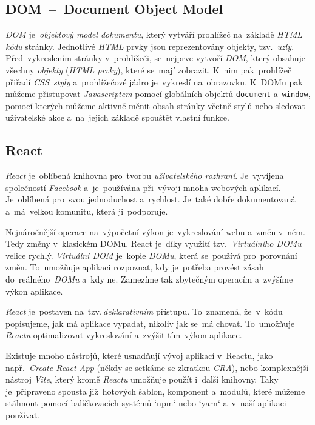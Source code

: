 \documentclass[10pt,a4paper]{article}
\begin{document}
        \subsection{DOM~--~Document Object Model}
        \emph{DOM} je~\emph{objektový model dokumentu}, který vytváří prohlížeč na~základě \emph{HTML kódu} stránky. Jednotlivé \emph{HTML} prvky jsou reprezentovány objekty, tzv.~\emph{uzly}. Před~vykreslením stránky v~prohlížeči, se~nejprve vytvoří \emph{DOM}, který obsahuje všechny \emph{objekty} (\emph{HTML prvky}), které se~mají zobrazit. K~nim pak~prohlížeč přiřadí \emph{CSS~styly} a~prohlížečové jádro je~vykreslí na~obrazovku. K~DOMu pak můžeme přistupovat \emph{Javascriptem} pomocí globálních objektů \texttt{document} a~\texttt{window}, pomocí kterých můžeme aktivně měnit obsah stránky včetně stylů nebo sledovat uživatelské akce a~na~jejich základě spouštět vlastní funkce.\cite[2.1.01]{kantor_javascript}
        
        \subsection{React}
        \emph{React} je~oblíbená knihovna pro~tvorbu \emph{uživatelského rozhraní}. Je~vyvíjena společností \emph{Facebook} a~je~používána při~vývoji mnoha webových aplikací. Je~oblíbená pro~svou jednoduchost a~rychlost. Je~také dobře dokumentovaná a~má~velkou komunitu, která ji~podporuje.
        
        Nejnáročnější operace na~výpočetní výkon je~vykreslování webu a~změn v~něm. Tedy změny v~klasickém DOMu. React je~díky využití tzv.~\emph{Virtuálního DOMu} velice rychlý. \emph{Virtuální DOM} je~kopie \emph{DOMu}, která se~používá pro~porovnání změn. To~umožňuje aplikaci rozpoznat, kdy je~potřeba provést zásah do~reálného~\emph{DOMu} a~kdy ne. Zamezíme tak zbytečným operacím a~zvýšíme výkon aplikace. \cite{elrom2021react}
        
        \emph{React} je~postaven na~tzv.\,\emph{deklarativním} přístupu. To~znamená, že~v~kódu popisujeme, jak má aplikace vypadat, nikoliv jak se~má chovat. To~umožňuje \emph{Reactu} optimalizovat vykreslování a~zvýšit tím~výkon aplikace.
        
        Existuje mnoho nástrojů, které usnadňují vývoj aplikací v~Reactu, jako např.~\emph{Create React App} (někdy se setkáme se zkratkou \emph{CRA}), nebo komplexnější nástroj \emph{Vite}, který kromě \emph{Reactu} umožňuje použít i~další knihovny. Taky je~připraveno spousta již~hotových šablon, komponent a~modulů, které můžeme stáhnout pomocí balíčkovacích systémů `npm` nebo `yarn` a~v~naší aplikaci používat.
\end{document}
